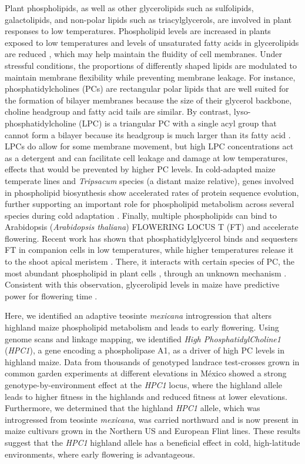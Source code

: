 \documentclass[9pt,twocolumn,twoside,lineno]{biorxiv}
\newcommand{\mex}{\textit{mexicana}\xspace}
\newcommand{\hpc}{\textit{HPC1}\xspace}
\begin{document}
Plant phospholipids, as well as other glycerolipids such as sulfolipids, galactolipids, and non-polar lipids such as triacylglycerols, are involved in plant responses to low temperatures.
Phospholipid levels are increased in plants exposed to low temperatures \cite{Degenkolbe2012-wf} and levels of unsaturated fatty acids in glycerolipids are reduced \cite{Welti2002-uk, Lynch1987-ln}, which may help maintain the fluidity of cell membranes.
Under stressful conditions, the proportions of differently shaped lipids are modulated to maintain membrane flexibility while preventing membrane leakage. 
For instance, phosphatidylcholines (PCs) are rectangular polar lipids that are well suited for the formation of bilayer membranes because the size of their glycerol backbone, choline headgroup and fatty acid tails are similar.
By contrast, lyso-phosphatidylcholine (LPC) is a triangular PC with a single acyl group that cannot form a bilayer because its headgroup is much larger than its fatty acid \cite{Jouhet2013-fv}.
LPCs do allow for some membrane movement, but high LPC concentrations act as a detergent \cite{Henriksen2010-cm} and can facilitate cell leakage and damage at low temperatures, effects that would be prevented by higher PC levels.
In cold-adapted maize temperate lines and \textit{Tripsacum} species (a distant maize relative), genes involved in  phospholipid biosynthesis show accelerated rates of protein sequence evolution, further supporting an important role for phospholipid metabolism across several species during cold adaptation \cite{Yan2019-tx}. 
Finally, multiple phospholipids can bind to Arabidopsis (\textit{Arabidopsis thaliana}) FLOWERING LOCUS T (FT) and accelerate flowering.
Recent work has shown that phosphatidylglycerol binds and sequesters FT in companion cells in low temperatures, while higher temperatures release it to the shoot apical meristem \cite{Susila2021-dz}.
There, it interacts with certain species of PC, the most abundant phospholipid in plant cells \cite{Gu2017-nd},  through an unknown mechanism \cite{Nakamura2014-qf}. 
Consistent with this observation, glycerolipid levels in maize have predictive power for flowering time \cite{Riedelsheimer2013-bd}. 

Here, we identified an adaptive teosinte \mex introgression that alters highland maize phospholipid metabolism and leads to early flowering.
Using genome scans and linkage mapping, we identified \textit{High PhosphatidylCholine1} (\hpc), a gene encoding a phospholipase A1, as a driver of high PC levels in highland maize. 
Data from thousands of genotyped landrace test-crosses grown in common garden experiments at different elevations in M\'exico showed a strong genotype-by-environment effect at the \hpc locus, where the highland allele leads to higher fitness in the highlands and reduced fitness at lower elevations.
Furthermore, we determined that the highland \hpc allele, which was introgressed from teosinte \mex, was carried northward and is now present in maize cultivars grown in the Northern US and European Flint lines.
These results suggest that the \hpc highland allele has a beneficial effect in cold, high-latitude environments, where early flowering is advantageous.
\end{document}

